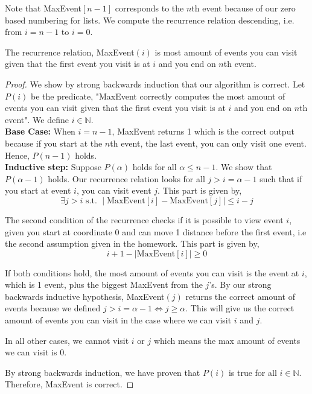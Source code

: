 \documentclass[11pt]{scrartcl}
\begin{document}
Note that MaxEvent$[n-1]$ corresponds to the $n$th event because of our zero based numbering for lists. We compute
the recurrence relation descending, i.e. from $i = n-1$ to $i=0$.
\begin{theorem*}
	The recurrence relation, MaxEvent$(i)$ is most amount of events you can visit given that the first event you visit is at $i$ 
	and you end on $n$th event.
	\begin{proof}
		We show by strong backwards induction that our algorithm is correct. Let $P(i)$ be the predicate,
		"MaxEvent correctly computes the most amount of events you can visit given that the first event you visit is at $i$ 
		and you end on $n$th event".
		We define $i\in \mathbb{N}$. \\
		\textbf{Base Case:} When $i = n - 1$, MaxEvent returns 1 which is the correct output because if you start 
		at the $n$th event, the last event, you can only visit one event. Hence, $P(n-1)$ holds.\\
		\textbf{Inductive step:} Suppose $P(\alpha)$ holds for all $\alpha \leq n - 1$. We show that $P(\alpha-1)$ holds.
		Our recurrence relation looks for all $j > i = \alpha-1$ such that if you start at event $i$, you can visit event $j$.
		This part is given by, $$\exists j > i \text{ s.t. } \mid \text{MaxEvent}[i]-\text{MaxEvent}[j] \mid \leq i - j$$
		\par The second condition of the recurrence checks if it is possible to view event $i$, given you start at coordinate 0
		and can move 1 distance before the first event, i.e the second assumption given in the homework. This part is given by, 
		$$ i + 1 - \mid \text{MaxEvent}[i] \mid  \geq 0$$
		\par If both conditions hold, the most amount of events you can visit is the event at $i$, which is 1 event, plus
		the biggest MaxEvent from the $j$'s. By our strong backwards inductive hypothesis,
		MaxEvent$(j)$ returns the correct amount of events because we defined 
		$ j > i = \alpha - 1 \Leftrightarrow j \geq \alpha$. 
		This will give us the correct amount of events you can visit in the case where we can visit $i$ and $j$. 
		\par In all other cases, we cannot visit $i$ or $j$ which means the max amount of events we can visit is 0.
		\par By strong backwards induction, we have proven that $P(i)$ is true for all $i \in \mathbb{N}$.
		Therefore, MaxEvent is correct.
	\end{proof}
\end{theorem*}
\end{document}
